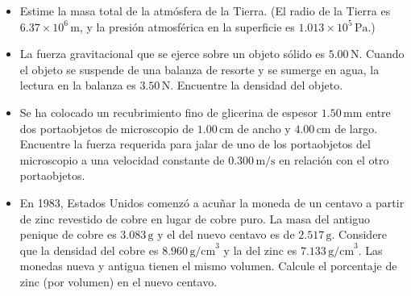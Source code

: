 \documentclass[11pt,a4paper]{article}
\begin{document}
\begin{itemize}
    \item[\textbf{1.}] Estime la masa total de la atmósfera de la Tierra. (El radio de la Tierra es \(6.37 \times 10^6\,\text{m}\), y la presión atmosférica en la superficie es \(1.013 \times 10^5\,\text{Pa}\).)
    \vspace*{6cm}
    
    \item[\textbf{2.}] La fuerza gravitacional que se ejerce sobre un objeto sólido es \(5.00\,\text{N}\). Cuando el objeto se suspende de una balanza de resorte y se sumerge en agua, la lectura en la balanza es \(3.50\,\text{N}\). Encuentre la densidad del objeto.
    
    \vspace*{7cm}
\end{itemize}

\newpage

\begin{itemize}
    \item[\textbf{3.}] Se ha colocado un recubrimiento fino de glicerina de espesor \(1.50\,\text{mm}\) entre dos portaobjetos de microscopio de \(1.00\,\text{cm}\) de ancho y \(4.00\,\text{cm}\) de largo. Encuentre la fuerza requerida para jalar de uno de los portaobjetos del microscopio a una velocidad constante de \(0.300\,\text{m/s}\) en relación con el otro portaobjetos.
    \vspace*{6cm}
    
    \item[\textbf{4.}] En 1983, Estados Unidos comenzó a acuñar la moneda de un centavo a partir de zinc revestido de cobre en lugar de cobre puro. La masa del antiguo penique de cobre es \(3.083\,\text{g}\) y el del nuevo centavo es de \(2.517\,\text{g}\). Considere que la densidad del cobre es \(8.960\,\text{g/cm}^3\) y la del zinc es \(7.133\,\text{g/cm}^3\). Las monedas nueva y antigua tienen el mismo volumen. Calcule el porcentaje de zinc (por volumen) en el nuevo centavo.
    \vspace*{7cm}
\end{itemize}
\end{document}
